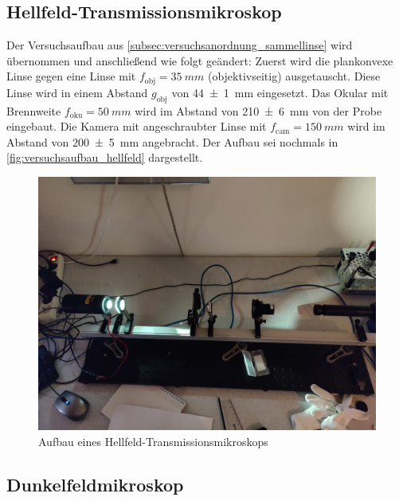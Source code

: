 \documentclass[english, ngerman]{scrartcl}
\begin{document}
\subsection{Hellfeld-Transmissionsmikroskop}
\label{subsec:versuchsanordnung_hellfeld}

Der Versuchsaufbau aus \autoref{subsec:versuchsanordnung_sammellinse} wird übernommen und anschließend wie folgt geändert: Zuerst wird die plankonvexe Linse gegen eine Linse mit $f_\text{obj} = \SI{35}{mm}$ (objektivseitig) ausgetauscht. Diese Linse wird in einem Abstand $g_{\text{obj}}$ von \SI{44(1)}{mm} eingesetzt. Das Okular mit Brennweite $f_\text{oku} = \SI{50}{mm}$ wird im Abstand von \SI{210(6)}{mm} von der Probe eingebaut. Die Kamera mit angeschraubter Linse mit $f_\text{cam} = \SI{150}{mm}$ wird im Abstand von \SI{200(5)}{mm} angebracht. %
Der Aufbau sei nochmals in \autoref{fig:versuchsaufbau_hellfeld} dargestellt.
%
\begin{figure}[H]
    \centering
    \begin{samepage}
        \includegraphics[width=\linewidth]{fig/Hellfeld_.jpeg}
        \caption{Aufbau eines Hellfeld-Transmissionsmikroskops}
        \label{fig:versuchsaufbau_hellfeld}
    \end{samepage}
\end{figure}


\subsection{Dunkelfeldmikroskop}
\label{subsec:versuchsanordnung_dunkelfeld}
\end{document}
